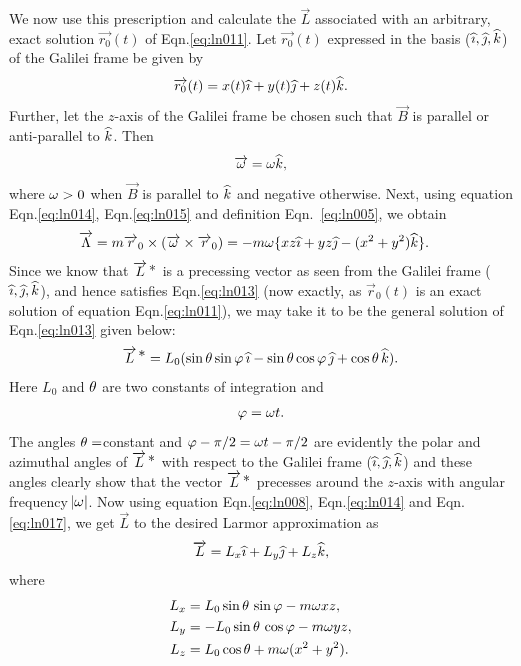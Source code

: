 We now use this prescription and calculate the $\vec{L}$ 
associated with an arbitrary, exact solution 
$\vec{r_{0}}(t)$ 
of Eqn.\eqref{eq:ln011}. Let $\vec{r_{0}}(t)$ 
expressed in the basis (${\widehat{\imath}},{\widehat{\jmath}}, {\widehat{k}}$) of the Galilei 
frame be given by
\begin{align}
 \overrightarrow{r_{0}}(t) = x(t){\widehat{\imath}} + y(t){\widehat{\jmath}} + z(t){\widehat{k}}.
\label{eq:ln014}
\end{align}
Further, let the $z$-axis of the Galilei frame be chosen 
such that $\vec{B}$ is parallel or anti-parallel to ${\widehat{k}}$. 
Then
 \begin{align}
 \overrightarrow{{\omega}} = {\omega}{\widehat{k}},
\label{eq:ln015}
\end{align}
where ${\omega} > 0$ when $\vec{B}$ is parallel to ${\widehat{k}}$ and 
negative otherwise. Next, using equation 
Eqn.\eqref{eq:ln014}, Eqn.\eqref{eq:ln015} and definition 
Eqn.~\break\eqref{eq:ln005}, we obtain
\begin{align}
\overrightarrow{\Lambda} &=
m\overrightarrow{r}_0\times({\overrightarrow{{\omega}}}\times{\overrightarrow{r}_{0}})
= -m{\omega} \{ xz{\widehat{\imath}} + yz{\widehat{\jmath}}- (x^2 + y^2){\widehat{k}} \}.
\label{eq:ln016}
\end{align}
Since we know that ${\overrightarrow{L}^{\,{\textstyle \ast}}}$ is a precessing vector as 
seen from the Galilei frame (${\widehat{\imath}}, {\widehat{\jmath}}, {\widehat{k}}$), and hence 
satisfies Eqn.\eqref{eq:ln013} (now exactly, as 
$\vec{r}_0 (t)$ is an exact solution of equation 
Eqn.\eqref{eq:ln011}), we may take it to be the general 
solution of Eqn.\eqref{eq:ln013} given below:
\begin{align}\label{eq:ln017}
{\overrightarrow{L}^{\,{\ensuremath{\textstyle \ast}}}} = L_{0}(\sin{\theta} \sin\varphi\,{\widehat{\imath}} - \sin{\theta}
\cos\varphi\,{\widehat{\jmath}} + \cos{\theta}\,{\widehat{k}}).
\end{align}
Here $L_{0}$ and ${\theta}$ are two constants of integration and
\begin{align}\label{eq:ln018}
 \varphi = {\omega} t.
\end{align}
The angles ${\theta}=$constant and $\varphi - \pi/2 = {\omega} t 
-\pi/2$ are evidently the polar and azimuthal angles of 
${\overrightarrow{L}^{\,{\textstyle \ast}}}$ with respect to the Galilei frame (${\widehat{\imath}},{\widehat{\jmath}}, 
{\widehat{k}}$) and these angles clearly show that the vector 
${\overrightarrow{L}^{\,{\textstyle \ast}}}$ precesses around the $z$-axis with angular 
frequency $\abs{{\omega}}$. Now using equation 
Eqn.\eqref{eq:ln008}, Eqn.\eqref{eq:ln014} and 
Eqn.\eqref{eq:ln017}, we get $\vec{L}$ to the desired 
Larmor 
approximation as
\begin{align}
 \overrightarrow{L} = L_{x}{\widehat{\imath}} + L_{y}{\widehat{\jmath}} + L_{z}{\widehat{k}},
\label{eq:ln019}
\end{align}
where
\begin{align}
 L_{x} & = L_{0}\sin{\theta}\, \sin\varphi - m {\omega} x z,
\notag \\
 L_{y} & = -L_{0}\sin{\theta}\, \cos\varphi - m {\omega} y z,
\notag \\
 L_{z} & = L_{0}\cos{\theta} + m{\omega}(x^2 + y^2).
\label{eq:ln020}
\end{align}

